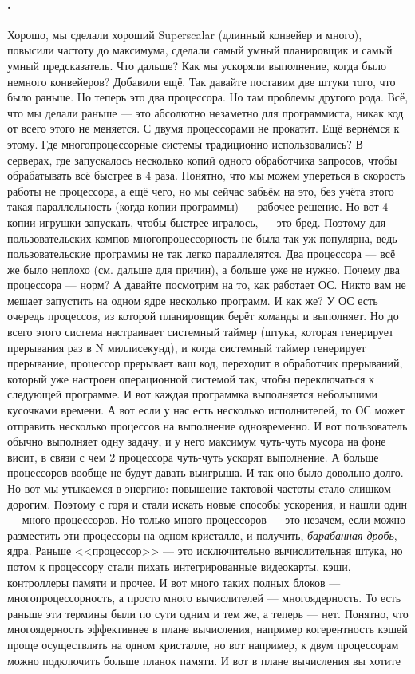 \documentclass{article}
\begin{document}
    \paragraph{.}
    Хорошо, мы сделали хороший Superscalar (длинный конвейер и много), повысили частоту до максимума, сделали самый умный планировщик и самый умный предсказатель. Что дальше? Как мы ускоряли выполнение, когда было немного конвейеров? Добавили ещё. Так давайте поставим две штуки того, что было раньше. Но теперь это два процессора. Но там проблемы другого рода. Всё, что мы делали раньше --- это абсолютно незаметно для программиста, никак код от всего этого не меняется. С двумя процессорами не прокатит. Ещё вернёмся к этому. Где многопроцессорные системы традиционно использовались? В серверах, где запускалось несколько копий одного обработчика запросов, чтобы обрабатывать всё быстрее в 4 раза. Понятно, что мы можем упереться в скорость работы не процессора, а ещё чего, но мы сейчас забьём на это, без учёта этого такая параллельность (когда копии программы) --- рабочее решение. Но вот 4 копии игрушки запускать, чтобы быстрее игралось, --- это бред. Поэтому для пользовательских компов многопроцессорность не была так уж популярна, ведь пользовательские программы не так легко параллелятся. Два процессора --- всё же было неплохо (см. дальше для причин), а больше уже не нужно. Почему два процессора --- норм? А давайте посмотрим на то, как работает ОС. Никто вам не мешает запустить на одном ядре несколько программ. И как же? У ОС есть очередь процессов, из которой планировщик берёт команды и выполняет. Но до всего этого система настраивает системный таймер (штука, которая генерирует прерывания раз в N миллисекунд), и когда системный таймер генерирует прерывание, процессор прерывает ваш код, переходит в обработчик прерываний, который уже настроен операционной системой так, чтобы переключаться к следующей программе. И вот каждая программка выполняется небольшими кусочками времени. А вот если у нас есть несколько исполнителей, то ОС может отправить несколько процессов на выполнение одновременно. И вот пользователь обычно выполняет одну задачу, и у него максимум чуть-чуть мусора на фоне висит, в связи с чем 2 процессора чуть-чуть ускорят выполнение. А больше процессоров вообще не будут давать выигрыша. И так оно было довольно долго. Но вот мы утыкаемся в энергию: повышение тактовой частоты стало слишком дорогим. Поэтому с горя и стали искать новые способы ускорения, и нашли один --- много процессоров. Но только много процессоров --- это незачем, если можно разместить эти процессоры на одном кристалле, и получить, \textit{барабанная дробь}, ядра. Раньше <<процессор>> --- это исключительно вычислительная штука, но потом к процессору стали пихать интегрированные видеокарты, кэши, контроллеры памяти и прочее. И вот много таких полных блоков --- многопроцессорность, а просто много вычислителей --- многоядерность. То есть раньше эти термины были по сути одним и тем же, а теперь --- нет. Понятно, что многоядерность эффективнее в плане вычисления, например когерентность кэшей проще осуществлять на одном кристалле, но вот например, к двум процессорам можно подключить больше планок памяти. И вот в плане вычисления вы хотите 
\end{document}
